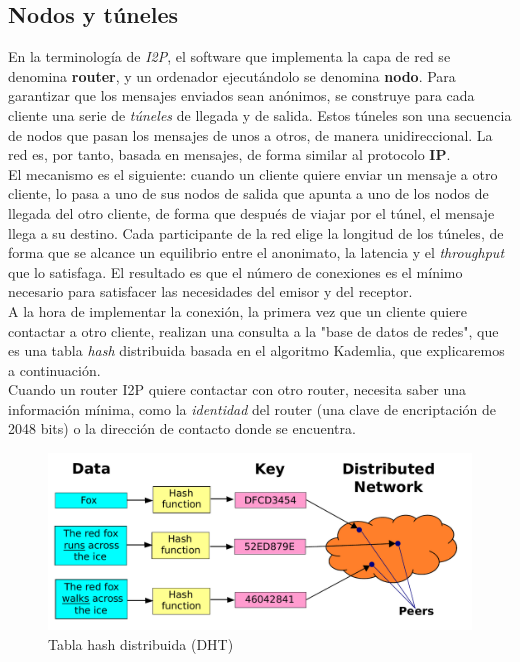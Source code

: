 \subsection{Nodos y túneles}

En la terminología de \textit{I2P}, el software que implementa la capa de red se denomina \textbf{router}, y un ordenador ejecutándolo se denomina \textbf{nodo}. Para garantizar que los mensajes enviados sean anónimos, se construye para cada cliente una serie de \textit{túneles} de llegada y de salida. Estos túneles son una secuencia de nodos que pasan los mensajes de unos a otros, de manera unidireccional. La red es, por tanto, basada en mensajes, de forma similar al protocolo \textbf{IP}.\\

El mecanismo es el siguiente: cuando un cliente quiere enviar un mensaje a otro cliente, lo pasa a uno de sus nodos de salida que apunta a uno de los nodos de llegada del otro cliente, de forma que después de viajar por el túnel, el mensaje llega a su destino. Cada participante de la red elige la longitud de los túneles, de forma que se alcance un equilibrio entre el anonimato, la latencia y el \textit{throughput} que lo satisfaga. El resultado es que el número de conexiones es el mínimo necesario para satisfacer las necesidades del emisor y del receptor.\\


A la hora de implementar la conexión, la primera vez que un cliente quiere contactar a otro cliente, realizan una consulta a la "base de datos de redes", que es una tabla \textit{hash} distribuida basada en el algoritmo Kademlia, que explicaremos a continuación.\\

Cuando un router I2P quiere contactar con otro router, necesita saber una información mínima, como la \textit{identidad} del router (una clave de encriptación de 2048 bits) o la dirección de contacto donde se encuentra.\\

\begin{figure}
    \centering
	\includegraphics[width=.8\textwidth]{img/DHT}
	\caption{Tabla hash distribuida (DHT)}
\end{figure}


